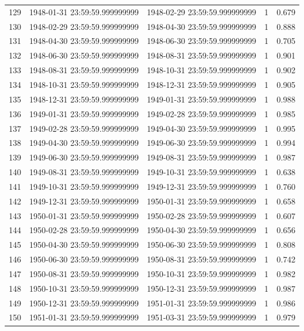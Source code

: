 \begin{table}
\begin{tabular}{lcccc}
129 & 1948-01-31 23:59:59.999999999 & 1948-02-29 23:59:59.999999999 & 1 & 0.679 \\
130 & 1948-02-29 23:59:59.999999999 & 1948-04-30 23:59:59.999999999 & 1 & 0.888 \\
131 & 1948-04-30 23:59:59.999999999 & 1948-06-30 23:59:59.999999999 & 1 & 0.705 \\
132 & 1948-06-30 23:59:59.999999999 & 1948-08-31 23:59:59.999999999 & 1 & 0.901 \\
133 & 1948-08-31 23:59:59.999999999 & 1948-10-31 23:59:59.999999999 & 1 & 0.902 \\
134 & 1948-10-31 23:59:59.999999999 & 1948-12-31 23:59:59.999999999 & 1 & 0.905 \\
135 & 1948-12-31 23:59:59.999999999 & 1949-01-31 23:59:59.999999999 & 1 & 0.988 \\
136 & 1949-01-31 23:59:59.999999999 & 1949-02-28 23:59:59.999999999 & 1 & 0.985 \\
137 & 1949-02-28 23:59:59.999999999 & 1949-04-30 23:59:59.999999999 & 1 & 0.995 \\
138 & 1949-04-30 23:59:59.999999999 & 1949-06-30 23:59:59.999999999 & 1 & 0.994 \\
139 & 1949-06-30 23:59:59.999999999 & 1949-08-31 23:59:59.999999999 & 1 & 0.987 \\
140 & 1949-08-31 23:59:59.999999999 & 1949-10-31 23:59:59.999999999 & 1 & 0.638 \\
141 & 1949-10-31 23:59:59.999999999 & 1949-12-31 23:59:59.999999999 & 1 & 0.760 \\
142 & 1949-12-31 23:59:59.999999999 & 1950-01-31 23:59:59.999999999 & 1 & 0.658 \\
143 & 1950-01-31 23:59:59.999999999 & 1950-02-28 23:59:59.999999999 & 1 & 0.607 \\
144 & 1950-02-28 23:59:59.999999999 & 1950-04-30 23:59:59.999999999 & 1 & 0.656 \\
145 & 1950-04-30 23:59:59.999999999 & 1950-06-30 23:59:59.999999999 & 1 & 0.808 \\
146 & 1950-06-30 23:59:59.999999999 & 1950-08-31 23:59:59.999999999 & 1 & 0.742 \\
147 & 1950-08-31 23:59:59.999999999 & 1950-10-31 23:59:59.999999999 & 1 & 0.982 \\
148 & 1950-10-31 23:59:59.999999999 & 1950-12-31 23:59:59.999999999 & 1 & 0.987 \\
149 & 1950-12-31 23:59:59.999999999 & 1951-01-31 23:59:59.999999999 & 1 & 0.986 \\
150 & 1951-01-31 23:59:59.999999999 & 1951-03-31 23:59:59.999999999 & 1 & 0.979 \\

\end{tabular}
\end{table}
